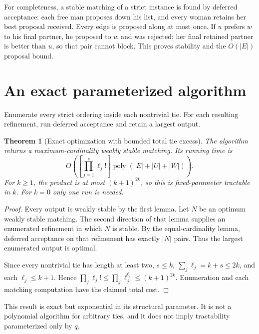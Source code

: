 \documentclass[11pt,a4paper]{article}
\newtheorem{theorem}{Theorem}[section]
\theoremstyle{definition}
\theoremstyle{remark}
\begin{document}
For completeness, a stable matching of a strict instance is found by deferred acceptance: each free man proposes down his list, and every woman retains her best proposal received. Every edge is proposed along at most once. If $u$ prefers $w$ to his final partner, he proposed to $w$ and was rejected; her final retained partner is better than $u$, so that pair cannot block. This proves stability and the $O(|E|)$ proposal bound.
\section{An exact parameterized algorithm}
Enumerate every strict ordering inside each nontrivial tie. For each resulting refinement, run deferred acceptance and retain a largest output.

\begin{theorem}[Exact optimization with bounded total tie excess]
The algorithm returns a maximum-cardinality weakly stable matching. Its running time is
\[
 O\left(\left[\prod_{j=1}^s\ell_j!\right]\operatorname{poly}(|E|+|U|+|W|)\right).
\]
For $k\ge1$, the product is at most $(k+1)^{2k}$, so this is fixed-parameter tractable in $k$. For $k=0$ only one run is needed.
\end{theorem}
\begin{proof}
Every output is weakly stable by the first lemma. Let $N$ be an optimum weakly stable matching. The second direction of that lemma supplies an enumerated refinement in which $N$ is stable. By the equal-cardinality lemma, deferred acceptance on that refinement has exactly $|N|$ pairs. Thus the largest enumerated output is optimal.

Since every nontrivial tie has length at least two, $s\le k$, $\sum_j\ell_j=k+s\le2k$, and each $\ell_j\le k+1$. Hence
$\prod_j\ell_j!\le\prod_j\ell_j^{\ell_j}\le(k+1)^{2k}$.
Enumeration and each matching computation have the claimed total cost.
\end{proof}

This result is exact but exponential in its structural parameter. It is not a polynomial algorithm for arbitrary ties, and it does not imply tractability parameterized only by $q$.
\end{document}
